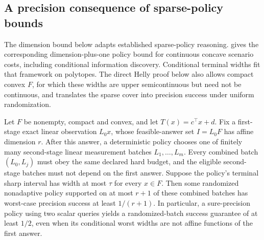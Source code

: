 \subsection{A precision consequence of sparse-policy bounds}
The dimension bound below adapts established sparse-policy reasoning.
\citet[Theorem~2 and Example~5]{kurtz2026} gives the corresponding
dimension-plus-one policy bound for continuous concave scenario costs,
including conditional information discovery. Conditional terminal widths
fit that framework on polytopes. The direct Helly proof below also allows
compact convex $F$, for which these widths are upper semicontinuous but
need not be continuous, and translates the sparse cover into precision
success under uniform randomization.
\begin{theorem}
\label{thm:helly-precision}
Let $F$ be nonempty, compact and convex, and let $T(x)=c^\top x+d$.
Fix a first-stage exact linear observation $L_0x$, whose feasible-answer
set $I=L_0F$ has affine dimension $r$. After this answer, a deterministic
policy chooses one of finitely many second-stage linear measurement
batches $L_1,\ldots,L_m$. Every combined batch $(L_0,L_j)$ must obey the
same declared hard budget, and the eligible second-stage batches must not
depend on the first answer. Suppose the policy's terminal sharp interval
has width at most $\tau$ for every $x\in F$.
Then some randomized nonadaptive policy supported on at most $r+1$
of these combined batches has worst-case precision success at least
$1/(r+1)$.
In particular, a sure-precision policy using two scalar queries yields
a randomized-batch success guarantee of at least $1/2$, even when its
conditional worst widths are not affine functions of the first answer.
\end{theorem}
